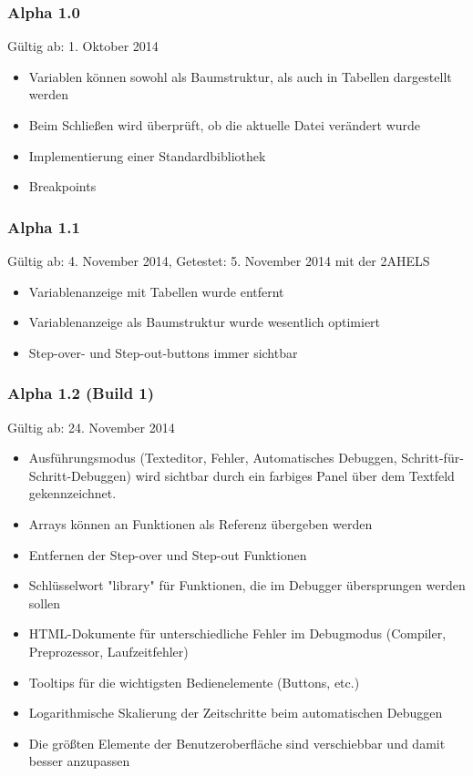 \subsubsection*{Alpha 1.0}
Gültig ab: 1. Oktober 2014
\begin{itemize}
\item Variablen können sowohl als Baumstruktur, als auch in Tabellen dargestellt werden
\item Beim Schließen wird überprüft, ob die aktuelle Datei verändert wurde
\item Implementierung einer Standardbibliothek
\item Breakpoints
\end{itemize}

\subsubsection*{Alpha 1.1}
Gültig ab: 4. November 2014,
Getestet: 5. November 2014 mit der 2AHELS
\begin{itemize}
\item Variablenanzeige mit Tabellen wurde entfernt
\item Variablenanzeige als Baumstruktur wurde wesentlich optimiert
\item Step-over- und Step-out-buttons immer sichtbar
\end{itemize}

\subsubsection*{Alpha 1.2 (Build 1)}
Gültig ab: 24. November 2014
\begin{itemize}
\item Ausführungsmodus (Texteditor, Fehler, Automatisches Debuggen, Schritt-für-Schritt-Debuggen) wird sichtbar durch ein farbiges Panel über dem Textfeld gekennzeichnet.
\item Arrays können an Funktionen als Referenz übergeben werden
\item Entfernen der Step-over und Step-out Funktionen
\item Schlüsselwort "library" für Funktionen, die im Debugger übersprungen werden sollen
\item HTML-Dokumente für unterschiedliche Fehler im Debugmodus (Compiler, Preprozessor, Laufzeitfehler)
\item Tooltips für die wichtigsten Bedienelemente (Buttons, etc.)
\item Logarithmische Skalierung der Zeitschritte beim automatischen Debuggen
\item Die größten Elemente der Benutzeroberfläche sind verschiebbar und damit besser anzupassen
\end{itemize}

